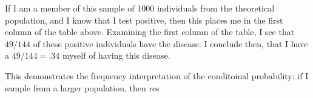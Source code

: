 \documentclass[11pt]{article}
\theoremstyle{definition}
\begin{document}
If I am a member of this sample of 1000 individuals
from the theoretical population, and I know that
I test positive, then this places me in the first
column of the table above.
Examining the first column of the table, I see
that $49 / 144$ of these positive individuals
have the disease. I conclude then,
that I have a $49 / 144 = .34$ myself
of having this disease.

This demonstrates the frequency interpretation of
the conditoinal probability: if I sample from
a larger population, then res
\end{document}
